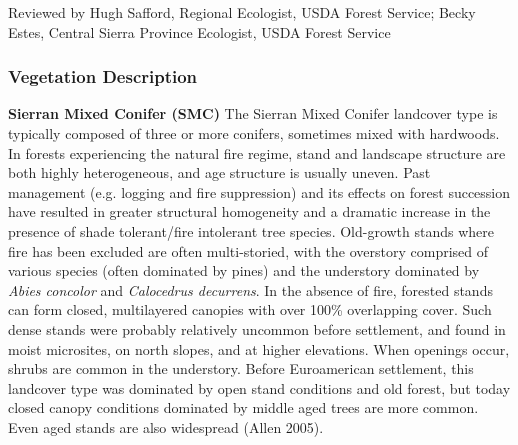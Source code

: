 \noindent Reviewed by Hugh Safford, Regional Ecologist, USDA Forest Service; Becky Estes, Central Sierra Province Ecologist, USDA Forest Service


\subsubsection{Vegetation Description}

\textbf{Sierran Mixed Conifer (SMC)} The Sierran Mixed Conifer landcover type is typically composed of three or more conifers, sometimes mixed with hardwoods. In forests experiencing the natural fire regime, stand and landscape structure are both highly heterogeneous, and age structure is usually uneven. Past management (e.g. logging and fire suppression) and its effects on forest succession have resulted in greater structural homogeneity and a dramatic increase in the presence of shade tolerant/fire intolerant tree species. Old-growth stands where fire has been excluded are often multi-storied, with the overstory comprised of various species (often dominated by pines) and the understory dominated by \emph{Abies concolor} and \emph{Calocedrus decurrens}. In the absence of fire, forested stands can form closed, multilayered canopies with over 100\% overlapping cover. Such dense stands were probably relatively uncommon before settlement, and found in moist microsites, on north slopes, and at higher elevations. When openings occur, shrubs are common in the understory. Before Euroamerican settlement, this landcover type was dominated by open stand conditions and old forest, but today closed canopy conditions dominated by middle aged trees are more common. Even aged stands are also widespread (Allen 2005). 

